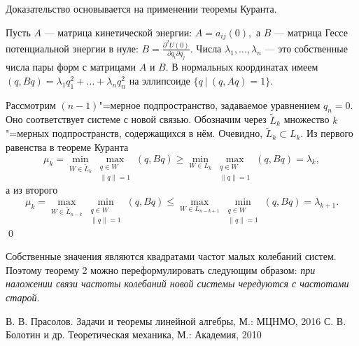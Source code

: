 \documentclass[11pt,a4paper]{article}
\begin{document}
Доказательство основывается на применении теоремы Куранта.

Пусть $A$ --- матрица кинетической энергии: $A=a_{ij}(0),$ а $B$ --- матрица Гессе потенциальной энергии в нуле: $B=\frac{\partial^2 U(0)}{\partial q_i\partial q_j}.$ Числа $\lambda_1,\ldots,\lambda_n$ --- это собственные числа пары форм с матрицами $A$ и $B.$ В нормальных координатах имеем $(q,Bq)=\lambda_1q_1^2+\ldots+\lambda_nq_n^2$ на эллипсоиде $\{q~|~(q,Aq)=1\}.$

Рассмотрим $(n-1)$"=мерное подпространство, задаваемое уравнением $q_n=0$. Оно соответствует системе с новой связью. Обозначим через $\tilde L_k$ множество $k$"=мерных подпространств, содержащихся в нём. Очевидно, $\tilde L_k\subset L_k.$
Из первого равенства в теореме Куранта
$$\mu_k=\min_{W\in \tilde L_{k}}\max_{\substack{q\in W\\\|q\|=1}}(q,Bq)\geqslant\min_{W\in L_{k}}\max_{\substack{q\in W\\\|q\|=1}}(q,Bq)=\lambda_k,$$
а из второго
$$\mu_k=\max_{W\in\tilde L_{n-k}}\min_{\substack{q\in W\\\|q\|=1}}(q,Bq)\leqslant\max_{W\in L_{n-k+1}}\min_{\substack{q\in W\\\|q\|=1}}(q,Bq)=\lambda_{k+1}.$$
\qed

Собственные значения являются квадратами частот малых колебаний систем. Поэтому теорему 2 можно переформулировать следующим образом:
\slshape при наложении связи частоты колебаний новой системы чередуются с частотами старой.\upshape
\begin{thebibliography}{3}
В. В. Прасолов.	Задачи и теоремы линейной алгебры, М.: МЦНМО, 2016
С. В. Болотин и др. Теоретическая механика, М.: Академия, 2010
\end{thebibliography}
\end{document}
